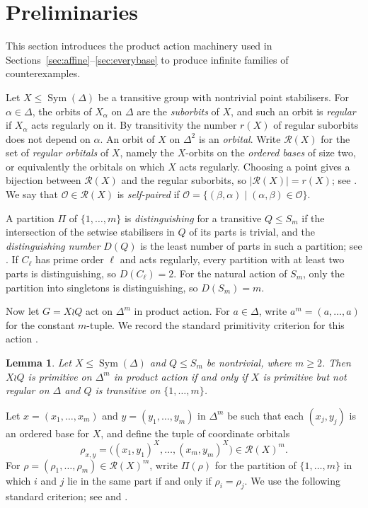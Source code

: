 \documentclass[a4paper,reqno,11pt]{amsart}
\newcommand\Symgrp{\operatorname{Sym}}
\newtheorem{lem}[thm]{Lemma}
\numberwithin{equation}{section}
\begin{document}
\section{Preliminaries} \label{sec:prelim}

This section introduces the product action machinery used in Sections~\ref{sec:affine}--\ref{sec:everybase} to produce infinite families of counterexamples.

Let $X\le\Symgrp(\Delta)$ be a transitive group with nontrivial point stabilisers. For $\alpha\in\Delta$, the orbits of $X_\alpha$ on $\Delta$ are the \emph{suborbits} of $X$, and such an orbit is \emph{regular} if $X_\alpha$ acts regularly on it. By transitivity the number $r(X)$ of regular suborbits does not depend on $\alpha$. An orbit of $X$ on $\Delta^2$ is an \emph{orbital}. Write $\mathcal R(X)$ for the set of \emph{regular orbitals} of $X$, namely the $X$-orbits on the \emph{ordered bases} of size two, or equivalently the orbitals on which $X$ acts regularly. Choosing a point gives a bijection between $\mathcal R(X)$ and the regular suborbits, so $|\mathcal R(X)|=r(X)$; see \cite[Remark~2.2]{BG}. We say that $\mathcal O\in\mathcal R(X)$ is \emph{self-paired} if $\mathcal O=\{(\beta,\alpha)\mid(\alpha,\beta)\in\mathcal O\}$.

A partition $\Pi$ of $\{1,\dots,m\}$ is \emph{distinguishing} for a transitive $Q\le S_m$ if the intersection of the setwise stabilisers in $Q$ of its parts is trivial, and the \emph{distinguishing number} $D(Q)$ is the least number of parts in such a partition; see \cite[Section~2]{BG}. If $C_\ell$ has prime order $\ell$ and acts regularly, every partition with at least two parts is distinguishing, so $D(C_\ell)=2$. For the natural action of $S_m$, only the partition into singletons is distinguishing, so $D(S_m)=m$.

Now let $G=X\wr Q$ act on $\Delta^m$ in product action. For $a\in\Delta$, write $a^m=(a,\dots,a)$ for the constant $m$-tuple. We record the standard primitivity criterion for this action \cite[Lemma~2.7A]{DM}.

\begin{lem}\label{paprim}
Let $X\le\Symgrp(\Delta)$ and $Q\le S_m$ be nontrivial, where $m\ge2$. Then $X\wr Q$ is primitive on $\Delta^m$ in product action if and only if $X$ is primitive but not regular on $\Delta$ and $Q$ is transitive on $\{1,\dots,m\}$.
\end{lem}

Let $x=(x_1,\dots,x_m)$ and $y=(y_1,\dots,y_m)$ in $\Delta^m$ be such that each $(x_j,y_j)$ is an ordered base for $X$, and define the tuple of coordinate orbitals
\[
\rho_{x,y}=\bigl((x_1,y_1)^X,\dots,(x_m,y_m)^X\bigr)
\in\mathcal R(X)^m.
\]
For $\rho=(\rho_1,\dots,\rho_m)\in\mathcal R(X)^m$, write $\Pi(\rho)$ for the partition of $\{1,\dots,m\}$ in which $i$ and $j$ lie in the same part if and only if $\rho_i=\rho_j$. We use the following standard criterion; see \cite[Lemma~2.8]{BG} and \cite[Lemma~4.1]{BH}.
\end{document}
